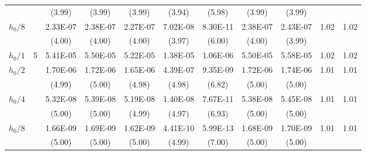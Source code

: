 \documentclass[compress]{beamer}
\begin{document}
\begin{frame}[shrink=10]
{\begin{tabular}{|cc|cc|ccc|cc|rr|}
\\[-0.01cm]
   \multicolumn{2}{|c|}{{}}
 & (3.99)
 & (3.99)
 & (3.99)
 & (3.94)
 & (5.98)
 & (3.99)
 & (3.99)
  &
  &
\\[-0.01cm]
$h_0/8$
 &
 &   2.33E-07
 &   2.38E-07
 &   2.27E-07
 &   7.02E-08
 &   8.30E-11
 &   2.38E-07
 &   2.43E-07
 &     \alert{1.02}
 &     1.02
\\[-0.01cm]
   \multicolumn{2}{|c|}{{}}
 & (4.00)
 & (4.00)
 & (4.00)
 & (3.97)
 & (6.00)
 & (4.00)
 & (3.99)
  &
  &
\\[-0.01cm]
 \hline
$h_0/1$
 &   \alert{5}
 &   5.41E-05
 &   5.50E-05
 &   5.22E-05
 &   1.38E-05
 &   1.06E-06
 &   5.50E-05
 &   5.58E-05
 &     \alert{1.02}
 &     1.02
\\[-0.01cm]
$h_0/2$
 &
 &   1.70E-06
 &   1.72E-06
 &   1.65E-06
 &   4.39E-07
 &   9.35E-09
 &   1.72E-06
 &   1.74E-06
 &     \alert{1.01}
 &     1.01
\\[-0.01cm]
   \multicolumn{2}{|c|}{{}}
 & (4.99)
 & (5.00)
 & (4.98)
 & (4.98)
 & (6.82)
 & (5.00)
 & (5.00)
  &
  &
\\[-0.01cm]
$h_0/4$
 &
 &   5.32E-08
 &   5.39E-08
 &   5.19E-08
 &   1.40E-08
 &   7.67E-11
 &   5.38E-08
 &   5.45E-08
 &     \alert{1.01}
 &     1.01
\\[-0.01cm]
   \multicolumn{2}{|c|}{{}}
 & (5.00)
 & (5.00)
 & (4.99)
 & (4.97)
 & (6.93)
 & (5.00)
 & (5.00)
  &
  &
\\[-0.01cm]
$h_0/8$
 &
 &   1.66E-09
 &   1.69E-09
 &   1.62E-09
 &   4.41E-10
 &   5.99E-13
 &   1.68E-09
 &   1.70E-09
 &     \alert{1.01}
 &     1.01
\\[-0.01cm]
   \multicolumn{2}{|c|}{{}}
 & (5.00)
 & (5.00)
 & (5.00)
 & (4.99)
 & (7.00)
 & (5.00)
 & (5.00)
  &
  &
\\
 \hline
 \end{tabular}
  } %

\end{frame}
\end{document}
